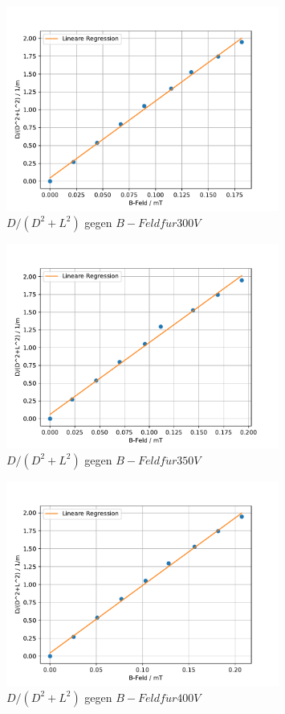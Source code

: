 \begin{figure}[h!]
 \centering
 \includegraphics[width=0.8\textwidth]{1-300V.pdf}
 \caption{$D/(D^2+L^2)$ gegen $B-Feld f\ddot{u}r 300V$}
 \label{fig:1-300V}
\end{figure}
\begin{figure}[h!]
 \centering
 \includegraphics[width=0.8\textwidth]{1-350V.pdf}
 \caption{$D/(D^2+L^2)$ gegen $B-Feld f\ddot{u}r 350V$}
 \label{fig:1-350V}
\end{figure}
\begin{figure}[h!]
 \centering
 \includegraphics[width=0.8\textwidth]{1-400V.pdf}
 \caption{$D/(D^2+L^2)$ gegen $B-Feld f\ddot{u}r 400V$}
 \label{fig:1-400V}
\end{figure}
